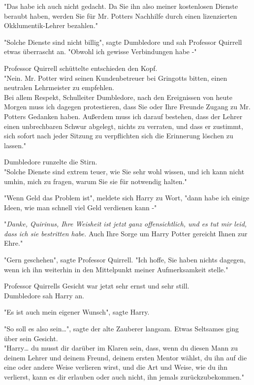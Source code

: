 {"Das habe ich auch nicht gedacht. Da Sie ihn also meiner kostenlosen Dienste beraubt haben, werden Sie für Mr. Potters Nachhilfe durch einen lizenzierten Okklumentik-Lehrer bezahlen."

"Solche Dienste sind nicht billig", sagte Dumbledore und sah Professor Quirrell etwas überrascht an. "Obwohl ich gewisse Verbindungen habe -"

Professor Quirrell schüttelte entschieden den Kopf.\\ "Nein. Mr. Potter wird seinen Kundenbetreuer bei Gringotts bitten, einen neutralen Lehrmeister zu empfehlen.\\ Bei allem Respekt, Schulleiter Dumbledore, nach den Ereignissen von heute Morgen muss ich dagegen protestieren, dass Sie oder Ihre Freunde Zugang zu Mr. Potters Gedanken haben. Außerdem muss ich darauf bestehen, dass der Lehrer einen unbrechbaren Schwur abgelegt, nichts zu verraten, und dass er zustimmt, sich sofort nach jeder Sitzung zu verpflichten sich die Erinnerung löschen zu lassen."

Dumbledore runzelte die Stirn.\\ "Solche Dienste sind extrem teuer, wie Sie sehr wohl wissen, und ich kann nicht umhin, mich zu fragen, warum Sie sie für notwendig halten."

"Wenn Geld das Problem ist", meldete sich Harry zu Wort, "dann habe ich einige Ideen, wie man schnell viel Geld verdienen kann -"

"\emph{Danke, Quirinus, Ihre Weisheit ist jetzt ganz offensichtlich, und es tut mir leid, dass ich sie bestritten habe.} Auch Ihre Sorge um Harry Potter gereicht Ihnen zur Ehre."

"Gern geschehen", sagte Professor Quirrell. "Ich hoffe, Sie haben nichts dagegen, wenn ich ihn weiterhin in den Mittelpunkt meiner Aufmerksamkeit stelle."

Professor Quirrells Gesicht war jetzt sehr ernst und sehr still.\\ Dumbledore sah Harry an.

"Es ist auch mein eigener Wunsch", sagte Harry.

"So soll es also sein…", sagte der alte Zauberer langsam. Etwas Seltsames ging über sein Gesicht.\\ "Harry… du musst dir darüber im Klaren sein, dass, wenn du diesen Mann zu deinem Lehrer und deinem Freund, deinem ersten Mentor wählst, du ihn auf die eine oder andere Weise verlieren wirst, und die Art und Weise, wie du ihn verlierst, kann es dir erlauben oder auch nicht, ihn jemals zurückzubekommen."

}
